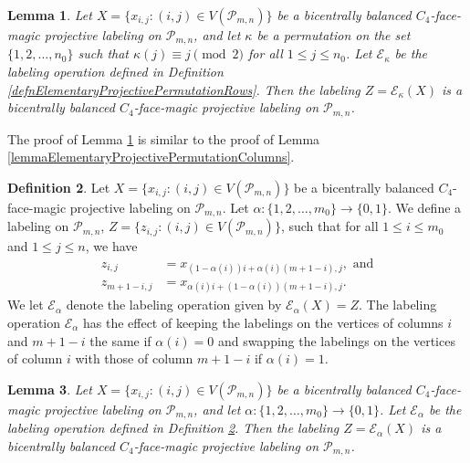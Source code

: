 \documentclass[12pt]{amsart}
\theoremstyle{definition}
\newtheorem{definition}{Definition}
\theoremstyle{plain}
\newtheorem{lemma}[definition]{Lemma}
\begin{document}
\begin{lemma}  \label{lemmaElementaryProjectivePermutationRows}
  Let $X=\{x_{i,j}:(i,j)\in V(\mathcal{P}_{m,n})\}$ be a bicentrally balanced $C_4$-face-magic projective labeling on $\mathcal{P}_{m,n}$, and
  let $\kappa$ be a permutation on the set $\{1,2,\ldots,n_0\}$ such that $\kappa(j)\equiv j \pmod{2}$ for all $1 \leqslant j \leqslant n_0$.
  Let $\mathcal{E}_{\kappa}$ be the labeling operation defined in Definition \ref{defnElementaryProjectivePermutationRows}.
  Then the labeling $Z=\mathcal{E}_{\kappa}(X)$ is a bicentrally balanced $C_4$-face-magic projective labeling on $\mathcal{P}_{m,n}$.
\end{lemma}

The proof of Lemma \ref{lemmaElementaryProjectivePermutationRows} is similar to the proof of Lemma \ref{lemmaElementaryProjectivePermutationColumns}.

\begin{definition} \label{defnElementaryProjectiveSwapColumns}
  Let $X=\{x_{i,j}:(i,j)\in V(\mathcal{P}_{m,n})\}$ be a bicentrally balanced $C_4$-face-magic projective labeling on $\mathcal{P}_{m,n}$.
  Let $\alpha: \{1,2,\ldots,m_0\}\rightarrow \{0,1\}$.
  We define a labeling on $\mathcal{P}_{m,n}$, $Z=\{z_{i,j}:(i,j)\in V(\mathcal{P}_{m,n})\}$,
  such that for all $1 \leqslant i \leqslant m_0$ and $1 \leqslant j \leqslant n$, we have
    \begin{align*}
      z_{i,j} &= x_{(1-\alpha(i))i +\alpha(i)(m+1-i),j}, \mbox{ \ \ and} \\
      z_{m+1-i,j} &= x_{\alpha(i)i + (1- \alpha(i)) (m+1-i),j}.
    \end{align*}
    We let $\mathcal{E}_{\alpha}$ denote the labeling operation given by $\mathcal{E}_{\alpha}(X)=Z$.
    The labeling operation $\mathcal{E}_{\alpha}$ has the effect of keeping the labelings on the vertices of columns $i$ and $m+1-i$ the same if $\alpha(i)=0$ and
    swapping the labelings on the vertices of column $i$ with those of column $m+1-i$ if $\alpha(i)=1$.
\end{definition}

\begin{lemma}  \label{lemmaElementaryProjectiveSwapColumns}
  Let $X=\{x_{i,j}:(i,j)\in V(\mathcal{P}_{m,n})\}$ be a bicentrally balanced $C_4$-face-magic projective labeling on $\mathcal{P}_{m,n}$, and
  let $\alpha: \{1,2,\ldots,m_0\}\rightarrow \{0,1\}$.
  Let $\mathcal{E}_{\alpha}$ be the labeling operation defined in Definition \ref{defnElementaryProjectiveSwapColumns}.
  Then the labeling $Z=\mathcal{E}_{\alpha}(X)$ is a bicentrally balanced $C_4$-face-magic projective labeling on $\mathcal{P}_{m,n}$.
\end{lemma}
\end{document}
